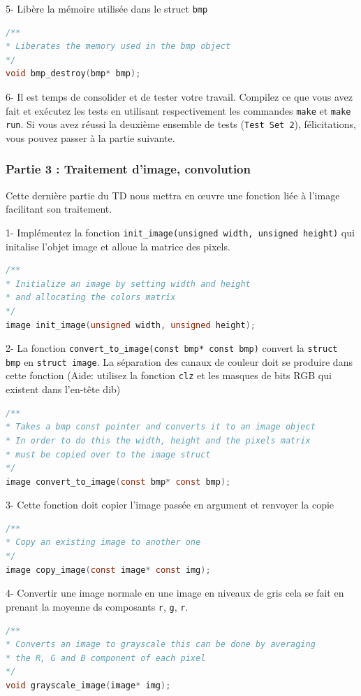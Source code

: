 \documentclass[a4paper]{article}
\begin{document}
	5- Libère la mémoire utilisée dans le struct \texttt{bmp}
	\begin{lstlisting}[language=C]
/**
* Liberates the memory used in the bmp object
*/ 
void bmp_destroy(bmp* bmp);
	\end{lstlisting}

	6- Il est temps de consolider et de tester votre travail. Compilez ce que vous avez fait et exécutez les tests en utilisant respectivement les commandes \texttt{make} et \texttt{make run}. Si vous avez réussi la deuxième ensemble de tests (\texttt{Test Set 2}), félicitations, vous pouvez passer à la partie suivante.
	
	\subsubsection*{Partie 3 : Traitement d'image, convolution}
	Cette dernière partie du TD nous mettra en œuvre une fonction liée à l'image facilitant son traitement.
	
	1- Implémentez la fonction \texttt{init\_image(unsigned width, unsigned height)} qui initalise l'objet image et alloue la matrice des pixels.
	\begin{lstlisting}[language=C]
/**
* Initialize an image by setting width and height
* and allocating the colors matrix
*/
image init_image(unsigned width, unsigned height);
	\end{lstlisting}

	2- La fonction \texttt{convert\_to\_image(const bmp* const bmp)} convert la \texttt{struct bmp} en \texttt{struct image}. La séparation des canaux de couleur doit se produire dans cette fonction (Aide: utilisez la fonction \texttt{clz} et les masques de bits RGB qui existent dans l'en-tête dib)
	\begin{lstlisting}[language=C]
/**
* Takes a bmp const pointer and converts it to an image object
* In order to do this the width, height and the pixels matrix 
* must be copied over to the image struct
*/ 
image convert_to_image(const bmp* const bmp);
	\end{lstlisting}
	
	3- Cette fonction doit copier l'image passée en argument et renvoyer la copie
\begin{lstlisting}[language=C]
/**
* Copy an existing image to another one
*/ 
image copy_image(const image* const img);
\end{lstlisting}

	4- Convertir une image normale en une image en niveaux de gris cela se fait en prenant la moyenne ds composants \texttt{r}, \texttt{g}, \texttt{r}.
	\begin{lstlisting}[language=C]
/**
* Converts an image to grayscale this can be done by averaging
* the R, G and B component of each pixel
*/
void grayscale_image(image* img);
	\end{lstlisting}
\end{document}
